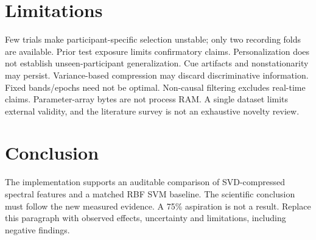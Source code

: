 \documentclass[conference]{IEEEtran}
\begin{document}
\section{Limitations}
Few trials make participant-specific selection unstable; only two recording folds
are available. Prior test exposure limits confirmatory claims. Personalization does
not establish unseen-participant generalization. Cue artifacts and nonstationarity
may persist. Variance-based compression may discard discriminative information.
Fixed bands/epochs need not be optimal. Non-causal filtering excludes real-time
claims. Parameter-array bytes are not process RAM. A single dataset limits external
validity, and the literature survey is not an exhaustive novelty review.

\section{Conclusion}
The implementation supports an auditable comparison of SVD-compressed spectral
features and a matched RBF SVM baseline. The scientific conclusion must follow the
new measured evidence. A 75\% aspiration is not a result. Replace this paragraph
with observed effects, uncertainty and limitations, including negative findings.


\end{document}
